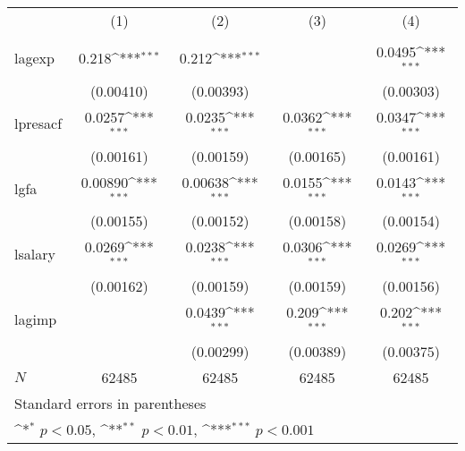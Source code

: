 {
\def\sym#1{\ifmmode^{#1}\else\(^{#1}\)\fi}
\begin{tabular}{l*{4}{c}}
\hline\hline
            &\multicolumn{1}{c}{(1)}&\multicolumn{1}{c}{(2)}&\multicolumn{1}{c}{(3)}&\multicolumn{1}{c}{(4)}\\
            &\multicolumn{1}{c}{} &\multicolumn{1}{c}{} &\multicolumn{1}{c}{} &\multicolumn{1}{c}{} \\
\hline
lagexp      &       0.218\sym{***}&       0.212\sym{***}&                     &      0.0495\sym{***}\\
            &   (0.00410)         &   (0.00393)         &                     &   (0.00303)         \\
[1em]
lpresacf    &      0.0257\sym{***}&      0.0235\sym{***}&      0.0362\sym{***}&      0.0347\sym{***}\\
            &   (0.00161)         &   (0.00159)         &   (0.00165)         &   (0.00161)         \\
[1em]
lgfa        &     0.00890\sym{***}&     0.00638\sym{***}&      0.0155\sym{***}&      0.0143\sym{***}\\
            &   (0.00155)         &   (0.00152)         &   (0.00158)         &   (0.00154)         \\
[1em]
lsalary     &      0.0269\sym{***}&      0.0238\sym{***}&      0.0306\sym{***}&      0.0269\sym{***}\\
            &   (0.00162)         &   (0.00159)         &   (0.00159)         &   (0.00156)         \\
[1em]
lagimp      &                     &      0.0439\sym{***}&       0.209\sym{***}&       0.202\sym{***}\\
            &                     &   (0.00299)         &   (0.00389)         &   (0.00375)         \\
\hline
\(N\)       &       62485         &       62485         &       62485         &       62485         \\
\hline\hline
\multicolumn{5}{l}{\footnotesize Standard errors in parentheses}\\
\multicolumn{5}{l}{\footnotesize \sym{*} \(p<0.05\), \sym{**} \(p<0.01\), \sym{***} \(p<0.001\)}\\
\end{tabular}
}
